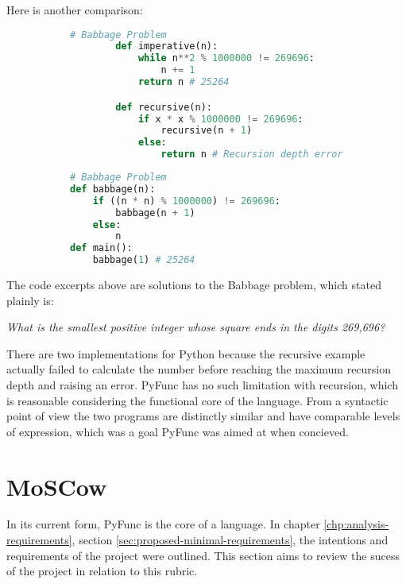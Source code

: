 \documentclass{l4proj}
\begin{document}
Here is another comparison:

\begin{figure}[H]
    \begin{subfigure}{0.45\textwidth}
        \begin{lstlisting}[language=Python, label=lst:python-gcd, caption=Python solutions to the Babbage problem. ]
        # Babbage Problem
        def imperative(n):
            while n**2 % 1000000 != 269696:
                n += 1 
            return n # 25264

        def recursive(n):
            if x * x % 1000000 != 269696:
                recursive(n + 1)
            else:
                return n # Recursion depth error.
        \end{lstlisting}
    \end{subfigure}
    \hfill
    \begin{subfigure}{0.45\textwidth}
        \begin{lstlisting}[language=Python, label=lst:pyfunc-gcd, caption=Pyfunc greatest common divisor example program.]
# Babbage Problem
def babbage(n):
    if ((n * n) % 1000000) != 269696:
        babbage(n + 1)
    else:
        n
def main():
    babbage(1) # 25264
        \end{lstlisting}
    \end{subfigure}
    \end{figure}

The code excerpts above are solutions to the Babbage problem\citep{babbage_problem}, which stated plainly is:

\begin{center}
    \emph{What is the smallest positive integer whose square ends in the digits 269,696?}
\end{center}

There are two implementations for Python because the recursive example actually failed to calculate the number before reaching the maximum recursion depth and raising an error.
PyFunc has no such limitation with recursion, which is reasonable considering the functional core of the language.
From a syntactic point of view the two programs are distinctly similar and have comparable levels of expression, which was a goal PyFunc was aimed at when concieved.

\section{MoSCow}

In its current form, PyFunc is the core of a language.
In chapter \ref{chp:analysis-requirements}, section \ref{sec:proposed-minimal-requirements}, the intentions and requirements of the project were outlined.
This section aims to review the sucess of the project in relation to this rubric.
\end{document}
